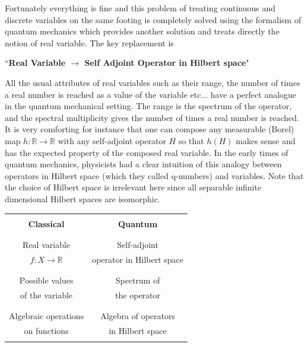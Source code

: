 \documentclass[12pt]{article}
\def\R{{\mathbb R}}
\begin{document}
Fortunately everything is fine and this problem of treating continuous and discrete variables on the same footing is completely solved using the formalism of quantum mechanics which  provides another solution and treats directly the notion of real variable. The key replacement is 
\vspace{0.5cm}
 
 \centerline{``{\bf Real Variable $\to$ Self Adjoint Operator in Hilbert space}" }
 
 \vspace{0.5cm}

All the usual attributes of real variables such as their range, the number of times a real number is reached as a value of the variable etc... have a perfect analogue in the quantum mechanical setting.
The range is the spectrum of the operator, and the spectral multiplicity gives the number of times a real number is reached. It is very comforting for instance that one can compose any measurable (Borel) map $h:\R\to \R$ with any self-adjoint operator $H$ so that $h(H)$ makes sense and has the expected property of the composed real variable. In the early times of quantum mechanics, physicists had a clear intuition of this analogy between operators in Hilbert space (which they called q-numbers) and variables.
 Note that the choice of Hilbert space is irrelevant here since all separable infinite dimensional Hilbert spaces are isomorphic.  
 \bigskip 
 
\begin{center}
\begin{tabular}{|c|c|}
\hline &  \\
{\bf \color{blue}Classical } & {\bf \color{blue}Quantum }
\\
&\\
\hline &  \\
 Real variable & Self-adjoint  \\
$f:X\to \R$ & operator in Hilbert space\\
&\\
\hline &  \\
 Possible values &  Spectrum of   \\
 of the variable & the operator  \\
&\\ \hline &  \\
 Algebraic operations  & Algebra of operators \\
on functions & in Hilbert space\\
&\\ \hline 
\end{tabular}
\end{center}
\end{document}
